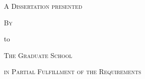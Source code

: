 \documentclass[
11pt, %
oneside, %
english, %
singlespacing, %
liststotoc, %
headsepline, %
]{MastersDoctoralThesis} %
\author{Caitao Zhan} %
\begin{document}
\frontmatter %

\pagestyle{plain} %


\begin{titlepage}

  \begin{center}

    \noindent 
    
    \noindent 
    
    \noindent 
    
    \noindent 
    
    \thispagestyle{empty}
    
    \noindent {\large \textsc{\textbf{\ttitle}}}
    
    \vspace{0.45cm}
    
    \vspace{0.45cm}
    
    \noindent \textsc{A Dissertation presented}
    
    \vspace{0.45cm}
    
    \noindent \textsc{By}
    
    \vspace{0.45cm}
    
    \noindent {\large \textsc{\textbf{\authorname}}}
    
    \vspace{0.45cm}
    
    \vspace{0.45cm}
    
    \noindent to
    
    \vspace{0.45cm}
    
    \noindent \textsc{The Graduate School}
    
    \vspace{0.45cm}
    
    \noindent \textsc{in Partial Fulfillment of the Requirements}
    
    \vspace{0.45cm}
    

\end{center}
\end{titlepage}
\end{document}
